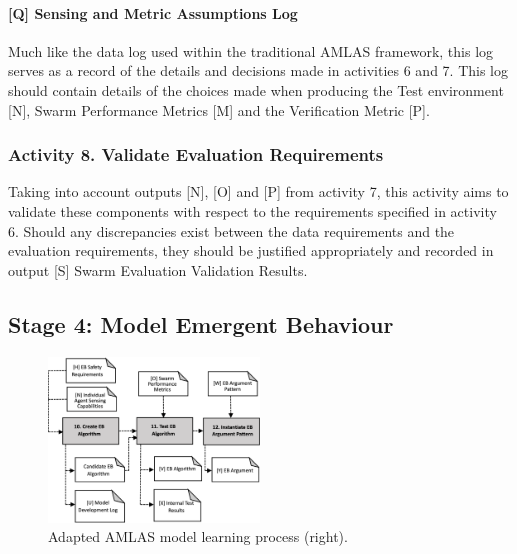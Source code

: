 \documentclass[lettersize,journal]{IEEEtran}
\begin{document}

\paragraph*{[Q] Sensing and Metric Assumptions Log}

Much like the data log used within the traditional AMLAS framework, this log serves as a record of the details and decisions made in activities 6 and 7. This log should contain details of the choices made when producing the Test environment [N], Swarm Performance Metrics [M] and the Verification Metric [P].

\subsubsection*{Activity 8. Validate Evaluation Requirements}

Taking into account outputs [N], [O] and [P] from activity 7, this activity aims to validate these components with respect to the requirements specified in activity 6. Should any discrepancies exist between the data requirements and the evaluation requirements, they should be justified appropriately and recorded in output [S] Swarm Evaluation Validation Results.

\subsection{Stage 4: Model Emergent Behaviour} \label{framework-stage4}


\begin{figure}
	\centering
	\includegraphics[width=0.5\textwidth]{figures/amlas-a-stage4-v2.png}%
	\caption{Adapted AMLAS model learning process (right).}
	\label{amlas-a-stage4}
\end{figure}
\end{document}
